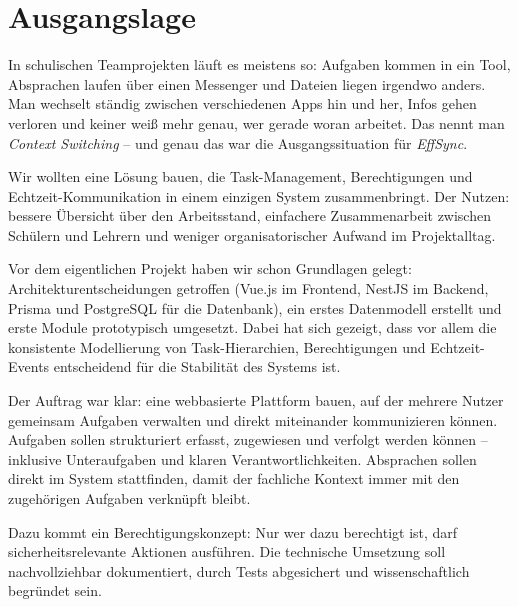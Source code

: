 \label{ch:ausgangslage}

\section{Ausgangslage} 

In schulischen Teamprojekten läuft es meistens so: Aufgaben kommen in ein Tool,
Absprachen laufen über einen Messenger und Dateien liegen irgendwo anders.
Man wechselt ständig zwischen verschiedenen Apps hin und her, Infos gehen verloren
und keiner weiß mehr genau, wer gerade woran arbeitet.
Das nennt man \textit{Context Switching} -- und genau das war die Ausgangssituation
für \textit{EffSync}.

\bigskip

Wir wollten eine Lösung bauen, die Task-Management, Berechtigungen und
Echtzeit-Kommunikation in einem einzigen System zusammenbringt.
Der Nutzen: bessere Übersicht über den Arbeitsstand, einfachere Zusammenarbeit
zwischen Schülern und Lehrern und weniger organisatorischer Aufwand im Projektalltag.

\bigskip

Vor dem eigentlichen Projekt haben wir schon Grundlagen gelegt:
Architekturentscheidungen getroffen (Vue.js im Frontend, NestJS im Backend,
Prisma und PostgreSQL für die Datenbank), ein erstes Datenmodell erstellt und
erste Module prototypisch umgesetzt.
Dabei hat sich gezeigt, dass vor allem die konsistente Modellierung von
Task-Hierarchien, Berechtigungen und Echtzeit-Events entscheidend für die
Stabilität des Systems ist.



Der Auftrag war klar: eine webbasierte Plattform bauen, auf der mehrere Nutzer
gemeinsam Aufgaben verwalten und direkt miteinander kommunizieren können.
Aufgaben sollen strukturiert erfasst, zugewiesen und verfolgt werden können --
inklusive Unteraufgaben und klaren Verantwortlichkeiten.
Absprachen sollen direkt im System stattfinden, damit der fachliche Kontext
immer mit den zugehörigen Aufgaben verknüpft bleibt.

\bigskip

Dazu kommt ein Berechtigungskonzept: Nur wer dazu berechtigt ist, darf
sicherheitsrelevante Aktionen ausführen.
Die technische Umsetzung soll nachvollziehbar dokumentiert, durch Tests
abgesichert und wissenschaftlich begründet sein.



